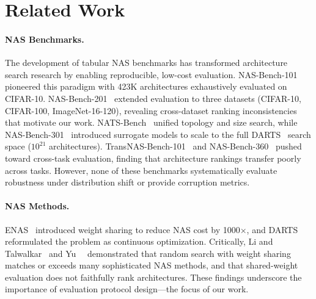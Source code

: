 \section{Related Work}
\label{sec:related}

\paragraph{NAS Benchmarks.}
The development of tabular NAS benchmarks has transformed architecture search research by enabling reproducible, low-cost evaluation.
NAS-Bench-101~\cite{ying2019nasbench101} pioneered this paradigm with 423K architectures exhaustively evaluated on CIFAR-10.
NAS-Bench-201~\cite{dong2020nasbench201} extended evaluation to three datasets (CIFAR-10, CIFAR-100, ImageNet-16-120), revealing cross-dataset ranking inconsistencies that motivate our work.
NATS-Bench~\cite{dong2021natsbench} unified topology and size search, while NAS-Bench-301~\cite{zela2022nasbench301} introduced surrogate models to scale to the full DARTS~\cite{liu2019darts} search space ($10^{21}$ architectures).
TransNAS-Bench-101~\cite{duan2021transnasbench101} and NAS-Bench-360~\cite{tu2022nasbench360} pushed toward cross-task evaluation, finding that architecture rankings transfer poorly across tasks.
However, none of these benchmarks systematically evaluate robustness under distribution shift or provide corruption metrics.

\paragraph{NAS Methods.}
ENAS~\cite{pham2018enas} introduced weight sharing to reduce NAS cost by 1000$\times$, and DARTS~\cite{liu2019darts} reformulated the problem as continuous optimization.
Critically, Li and Talwalkar~\cite{li2019randomnas} and Yu~\etal~\cite{yu2020evaluating} demonstrated that random search with weight sharing matches or exceeds many sophisticated NAS methods, and that shared-weight evaluation does not faithfully rank architectures.
These findings underscore the importance of evaluation protocol design---the focus of our work.

